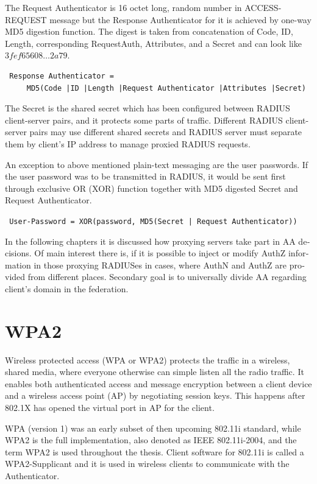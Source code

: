 \documentclass[12pt,a4paper,english]{tutthesis}
\begin{document}
\begin{otherlanguage}{english}
The Request Authenticator is 16 octet long, random number in
ACCESS-REQUEST message but the Response Authenticator for it is achieved
by one-way MD5 digestion function. 
The digest is taken from concatenation of Code, ID, Length, corresponding
Request\-Auth, Attributes, and a Secret and can look like 
$3fef65608\ldots 2a79$. 
\begin{verbatim}
 Response Authenticator = 
     MD5(Code |ID |Length |Request Authenticator |Attributes |Secret)
\end{verbatim}
The Secret is the shared secret which has been configured between
RADIUS client-server pairs,
and it protects some parts of traffic. 
Different RADIUS client-server pairs may use different
shared secrets and RADIUS server must separate them by client's IP address to
manage proxied RADIUS requests\cite{radiusbook}.

An exception to above mentioned plain-text messaging are the user passwords.
If the user password was to be transmitted in RADIUS, it would be sent first
through exclusive OR (XOR) function together with MD5 digested Secret
and Request Authenticator.
\begin{center}
{\tt 
User-Password = XOR(password, MD5(Secret | Request Authenticator))}
\end{center}




In the following chapters it is discussed how proxying servers take 
part in AA decisions. Of main interest there is, if it is possible 
to inject or modify AuthZ information in those proxying RADIUSes in
cases, where AuthN and AuthZ are provided from different
 places\cite{rfc2607}. Secondary goal is to universally divide AA regarding 
client's domain in the federation.




\section{WPA2}
\label{sec-2-3}

Wireless protected access (WPA or WPA2) protects the traffic in a wireless,
shared media, where everyone otherwise can simple listen all the radio traffic.
It enables both authenticated access and message
encryption between a client device and  a wireless access point (AP)
by negotiating session keys. This happens 
after 802.1X has opened the virtual port in AP for the client.

WPA (version 1)  was an early subset of then upcoming 802.11i standard,
while WPA2 is the full implementation, also denoted as IEEE
802.11i-2004, and the term WPA2 is used throughout the thesis.
Client software for 802.11i is called a WPA2-Supplicant and it is used
in wireless clients to communicate with the Authenticator. 


\end{otherlanguage}
\end{document}
